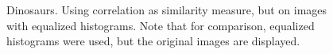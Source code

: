 \documentclass[11pt,a4paper]{article}
\begin{document}
\begin{figure}


\caption{Dinosaurs. Using correlation as similarity measure, but on images with equalized histograms. Note that for comparison, equalized histograms were used, but the original images are displayed.}
\label{fig:1}
\end{figure}
\end{document}
